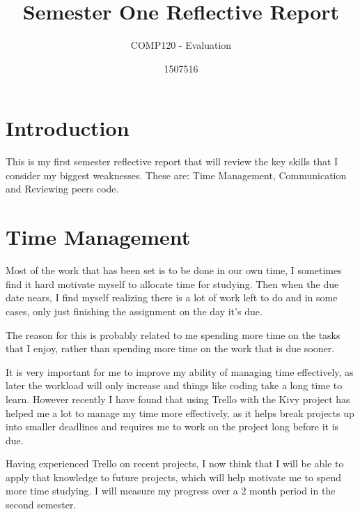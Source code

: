 \documentclass{scrartcl}
\title{Semester One Reflective Report}
\subtitle{COMP120 - Evaluation}
\author{1507516}
\begin{document}
\maketitle

\section{Introduction}
This is my first semester reflective report that will review the key skills that I consider my biggest weaknesses. These are: Time Management, Communication and Reviewing peers code.

\section{Time Management}

Most of the work that has been set is to be done in our own time, I sometimes find it hard motivate myself to allocate time for studying. Then when the due date nears, I find myself realizing there is a lot of work left to do and in some cases, only just finishing the assignment on the day it's due.

The reason for this is probably related to me spending more time on the tasks that I enjoy, rather than spending more time on the work that is due sooner.

It is very important for me to improve my ability of managing time effectively, as later the workload will only increase and things like coding take a long time to learn. However recently I have found that using Trello with the Kivy project has helped me a lot to manage my time more effectively, as it helps break projects up into smaller deadlines and requires me to work on the project long before it is due.

Having experienced Trello on recent projects, I now think that I will be able to apply that knowledge to future projects, which will help motivate me to spend more time studying. I will measure my progress over a 2 month period in the second semester.
\end{document}
